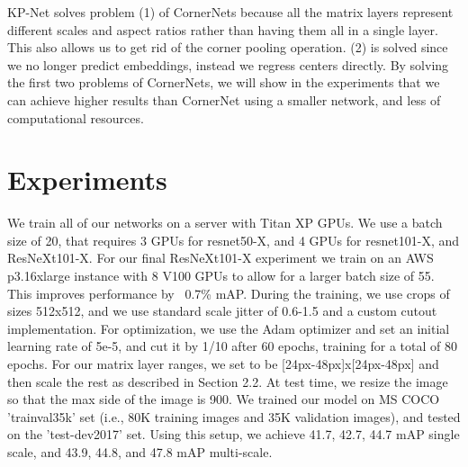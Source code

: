 \documentclass[10pt,twocolumn,letterpaper]{article}
\begin{document}
KP-Net solves problem (1) of CornerNets because all the matrix layers represent different scales and aspect ratios rather than having them all in a single layer. This also allows us to get rid of the corner pooling operation. (2) is solved since we no longer predict embeddings, instead we regress centers directly. By solving the first two problems of CornerNets, we will show in the experiments that we can achieve higher results than CornerNet using a smaller network, and less of computational resources.
\vspace{-0.25cm}
\section{Experiments}
\vspace{-0.25cm}
We train all of our networks on a server with Titan XP GPUs. We use a batch size of 20, that requires 3 GPUs for resnet50-X, and 4 GPUs for resnet101-X, and ResNeXt101-X. For our final ResNeXt101-X experiment we train on an AWS p3.16xlarge instance with 8 V100 GPUs to allow for a larger batch size of 55. This improves performance by ~0.7\% mAP. During the training, we use crops of sizes 512x512, and we use standard scale jitter of 0.6-1.5 and a custom cutout \cite{devries2017improved} implementation. For optimization, we use the Adam optimizer and set an initial learning rate of 5e-5, and cut it by 1/10 after 60 epochs, training for a total of 80 epochs. For our matrix layer ranges, we set  to be [24px-48px]x[24px-48px] and then scale the rest as described in Section 2.2. At test time, we resize the image so that the max side of the image is 900. We trained our model on MS COCO 'trainval35k' set (i.e., 80K training images and 35K validation images), and tested on the 'test-dev2017' set.  Using this setup, we achieve 41.7, 42.7, 44.7 mAP single scale, and 43.9, 44.8, and 47.8 mAP multi-scale.
\end{document}
